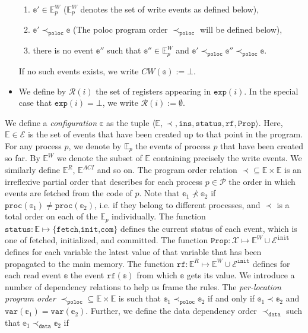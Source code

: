 \documentclass{article}
\begin{document}
\begin{itemize}
\begin{enumerate}
        \setlength\itemsep{0em}
        \item $\mathbb{e'} \in \mathbb{E}_p^W$ ($\mathbb{E}_p^W$ denotes the set of write events as defined below),
        \item $\mathbb{e'} \prec_\texttt{poloc} \mathbb{e}$ (The poloc program order  $\prec_\texttt{poloc}$ will be defined below),
        \item there is no event $\mathbb{e}''$ such that $\mathbb{e}'' \in \mathbb{E}_p^W$ and $\mathbb{e}' \prec_\texttt{poloc} \mathbb{e}'' \prec_\texttt{poloc} \mathbb{e}$.
    \end{enumerate}
    If no such events exists, we write $CW(\mathbb{e}) := \bot$.
    \item We define by $\mathcal{R}(i)$ the set of registers appearing in $\texttt{exp}(i)$. In the special case that $\texttt{exp}(i) = \bot$, we write $\mathcal{R}(i) := \emptyset$.
\end{itemize}
We define a \textit{configuration} $\mathbb{c}$ as the tuple $\langle\mathbb{E}, \prec, \texttt{ins}, \texttt{status}, \texttt{rf}, \texttt{Prop}\rangle$. Here, $\mathbb{E} \in \mathcal{E}$ is the set of events that have been created up to that point in the program. For any process $p$, we denote by $\mathbb{E}_p$ the events of process $p$ that have been created so far. By $\mathbb{E}^W$ we denote the subset of $\mathbb{E}$ containing precisely the write events. We similarly define $\mathbb{E}^R$, $\mathbb{E}^{ACI}$ and so on. The program order relation $\prec \subseteq \mathbb{E} \times \mathbb{E}$ is an irreflexive partial order that describes for each process $p \in \mathcal{P}$ the order in which events are fetched from the code of $p$. Note that $\mathbb{e}_1 \not\prec \mathbb{e}_2$ if $\texttt{proc}(\mathbb{e}_1) \neq \texttt{proc}(\mathbb{e}_2)$, i.e. if they belong to different processes, and $\prec$ is a total order on each of the $\mathbb{E}_p$ individually. The function $\texttt{status}:\mathbb{E} \mapsto \{\texttt{fetch,init,com}\}$ defines the current status of each event, which is one of fetched, initialized, and committed. The function $\texttt{Prop}: \mathcal{X} \mapsto \mathbb{E}^W \cup \mathcal{E}^\texttt{init}$ defines for each variable the latest value of that variable that has been propagated to the main memory. The function $\texttt{rf}:\mathbb{E}^R \mapsto \mathbb{E}^W \cup \mathcal{E}^\texttt{init}$ defines for each read event $\mathbb{e}$ the event $\texttt{rf}(\mathbb{e})$ from which $\mathbb{e}$ gets its value. 
We introduce a number of dependency relations to help us frame the rules. The \textit{per-location program order} $\prec_\texttt{poloc} \subseteq \mathbb{E} \times \mathbb{E}$ is such that $\mathbb{e}_1 \prec_\texttt{poloc} \mathbb{e}_2$ if and only if $\mathbb{e}_1 \prec \mathbb{e}_2$ and $\texttt{var}(\mathbb{e}_1) = \texttt{var}(\mathbb{e}_2)$. Further, we define the data dependency order $\prec_\texttt{data}$ such that $\mathbb{e}_1 \prec_\texttt{data} \mathbb{e}_2$ if 
\end{document}
